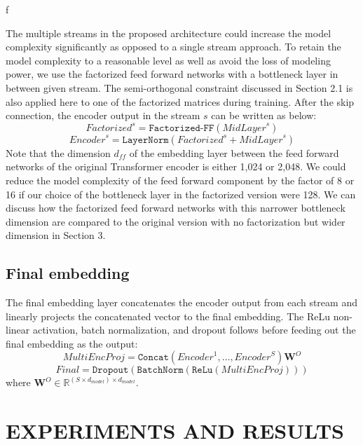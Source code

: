 f\documentclass{article}
\begin{document}
The multiple streams in the proposed architecture could increase the model complexity significantly as opposed to a single stream approach. To retain the model complexity to a reasonable level as well as avoid the loss of modeling power, we use the factorized feed forward networks with a bottleneck layer in between given stream. The semi-orthogonal constraint discussed in Section 2.1 is also applied here to one of the factorized matrices during training. After the skip connection, the encoder output in the stream $s$ can be written as below:
\begin{equation}
\textit{Factorized}^s  = \texttt{Factorized-FF} \left(  \textit{MidLayer}^s  \right) 
\end{equation}
\begin{equation}
\textit{Encoder}^s  = \texttt{LayerNorm} \left( \textit{Factorized}^s  + \textit{MidLayer}^s  \right)    
\end{equation}
Note that the dimension $d_{ff}$  of the embedding layer between the feed forward networks of the original Transformer encoder \cite{vaswani} is either 1,024 or 2,048. We could reduce the model complexity of the feed forward component by the factor of 8 or 16 if our choice of the bottleneck layer in the factorized version were 128. We can discuss how the factorized feed forward networks with this narrower bottleneck dimension are compared to the original version with no factorization but wider dimension in Section 3. 

\subsection{Final embedding}
The final embedding layer concatenates the encoder output from each stream and linearly projects the concatenated vector to the final embedding. The ReLu non-linear activation, batch normalization, and dropout follows before feeding out the final embedding as the output:
\begin{equation}
    \textit{MultiEncProj} = \texttt{Concat} \left( \textit{Encoder}^1, \dots, \textit{Encoder}^{S} \right) \bm{W}^O
\end{equation}
\begin{equation}
  \textit{Final} = \texttt{Dropout} \left( \texttt{BatchNorm} \left( \texttt{ReLu} \left( \textit{MultiEncProj} \right) \right) \right)
\end{equation}
where $\bm{W}^O \in \mathbb{R}^{\left( S \times d_{model} \right)  \times d_{model}}$.


\section{EXPERIMENTS AND RESULTS}
\end{document}
